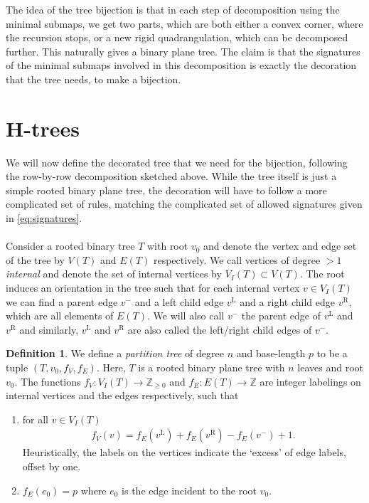 \documentclass[11pt]{article}
\theoremstyle{plain}
\theoremstyle{definition}
\newtheorem{definition}[theorem]{Definition}
\newcommand{\Z}{\mathbb{Z}}
\begin{document}
The idea of the tree bijection is that in each step of decomposition using the minimal submaps, we get two parts, which are both either a convex corner, where the recursion stops, or a new rigid quadrangulation, which can be decomposed further.
This naturally gives a binary plane tree. 
The claim is that the signatures of the minimal submaps involved in this decomposition is exactly the decoration that the tree needs, to make a bijection.

\FloatBarrier
\section{H-trees}\label{sec:H_trees}
\FloatBarrier
We will now define the decorated tree that we need for the bijection, following the row-by-row decomposition sketched above. 
While the tree itself is just a simple rooted binary plane tree, the decoration will have to follow a more complicated set of rules, matching the complicated set of allowed signatures given in \eqref{eq:signatures}.
\\\\
Consider a rooted binary tree $T$ with root $v_0$ and denote the vertex and edge set of the tree by $V(T)$ and $E(T)$ respectively.
We call vertices of degree $>1$ \emph{internal} and denote the set of internal vertices by $V_I(T)\subset V(T)$.
The root induces an orientation in the tree such that for each internal vertex $v\in V_I(T)$ we can find a parent edge $v^-$ and a left child edge $v^\textrm{L}$ and a right child edge $v^\textrm{R}$, which are all elements of $E(T)$. 
We will also call $v^-$ the parent edge of $v^\textrm{L}$ and $v^\textrm{R}$ and similarly, $v^\textrm{L}$ and $v^\textrm{R}$ are also called the left/right child edges of $v^-$.

\begin{definition}
    We define a \emph{partition tree} of degree $n$ and base-length $p$ to be a tuple $(T,v_0,f_V,f_E)$. 
    Here, $T$ is a rooted binary plane tree with $n$ leaves and root $v_0$. 
    The functions $f_V: V_I(T)\rightarrow \Z_{\geq0}$ and $f_E: E(T)\rightarrow\Z$ are integer labelings on internal vertices and the edges respectively, such that
    \begin{enumerate}[label=(P.\arabic*)]
        \item\label{enumitem:sum_condition} for all $v\in V_I(T)$ 
        \begin{align}\label{eq:fV_fE_relation}
            f_V(v)=f_E(v^\textrm{L})+f_E(v^\textrm{R}) - f_E(v^-)+1.
        \end{align}
        Heuristically, the labels on the vertices indicate the `excess' of edge labels, offset by one.
        \item\label{enumitem:root_label} $f_E(e_0)=p$ where $e_0$ is the edge incident to the root $v_0$.
    \end{enumerate}
\end{definition}
\end{document}
